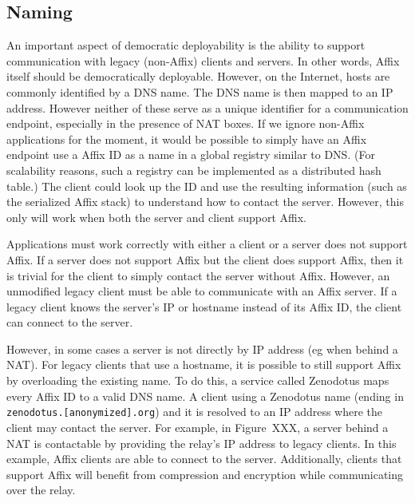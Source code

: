 \subsection{Naming}
\label{subsec-implementation-discussion}


An important aspect of democratic deployability is the ability to support 
communication with legacy (non-Affix) clients and servers.   In other 
words, Affix itself should be democratically deployable.   %
However, on the Internet, hosts are commonly identified by 
a DNS name.   The DNS name is then mapped to an IP address.
However neither of these serve as a unique identifier
for a communication endpoint, especially in the presence of NAT boxes.
If we ignore non-Affix applications for the moment, it would be possible
to simply have an Affix endpoint use a Affix ID
as a name in a global registry similar to DNS.   (For scalability reasons,
such a registry can be implemented as a distributed hash table.)
The client could look
up the ID and use the resulting information (such as the serialized 
Affix stack) to understand how to contact the server.   However, this only
will work when both the server and client support Affix.

Applications must work correctly with either a client or a server does not 
support Affix.   If a server does not support Affix but the client does support
Affix, then it is trivial for the client to simply contact the server
without Affix.
However, an unmodified legacy client 
must be able to communicate with an Affix server.   If a legacy client knows
the server's IP or hostname instead of its Affix ID, the client can connect
to the server.

However, in some cases a server is not directly by IP address (eg when
behind a NAT).
For legacy clients that use a hostname, it is possible to still support
Affix by overloading the existing name.  To do this, a service called 
Zenodotus maps every
Affix ID to a valid DNS name.   A client using a Zenodotus name
(ending in {\tt zenodotus.[anonymized].org}) and it is resolved to an
IP address where the client may contact the server. 
%
For example, in Figure~XXX, a server behind a NAT is contactable by 
providing the
relay's IP address to legacy clients.   In this example, Affix clients are 
able to connect to the server.   Additionally, clients that support
Affix will benefit from compression and encryption while communicating
over the relay.

